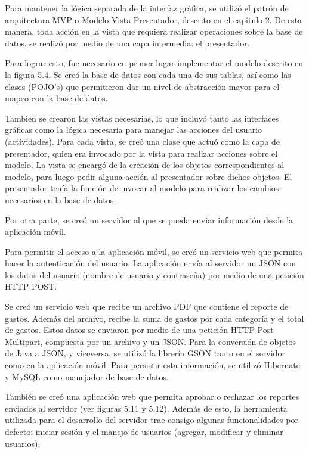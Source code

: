 Para mantener la lógica separada de la interfaz gráfica, se utilizó el patrón de arquitectura MVP o Modelo Vista Presentador, descrito en el capítulo 2. De esta manera, toda acción en la vista que requiera realizar operaciones sobre la base de datos, se realizó por medio de una capa intermedia: el presentador. 

Para lograr esto, fue necesario en primer lugar implementar el modelo descrito en la figura 5.4. Se creó la base de datos con cada una de sus tablas, así como las clases (POJO's) que permitieron dar un nivel de abstracción mayor para el mapeo con la base de datos.

También se crearon las vistas necesarias, lo que incluyó tanto las interfaces gráficas como la lógica necesaria para manejar las acciones del usuario (actividades). Para cada vista, se creó una clase que actuó como la capa de presentador, quien era invocado por la vista para realizar acciones sobre el modelo. La vista se encargó de la creación de los objetos correspondientes al modelo, para luego pedir alguna acción al presentador sobre dichos objetos. El presentador tenía la función de invocar al modelo para realizar los cambios necesarios en la base de datos.

Por otra parte, se creó un servidor al que se pueda enviar información desde la aplicación móvil. 

Para permitir el acceso a la aplicación móvil, se creó un servicio web que permita hacer la autenticación del usuario. La aplicación envía al servidor un JSON con los datos del usuario (nombre de usuario y contraseña) por medio de una petición HTTP POST.

Se creó un servicio web que recibe un archivo PDF que contiene el reporte de gastos. Además del archivo, recibe la suma de gastos por cada categoría y el total de gastos. Estos datos se enviaron por medio de una petición HTTP Post Multipart, compuesta por un archivo y un JSON. Para la conversión de objetos de Java a JSON, y viceversa, se utilizó la librería GSON tanto en el servidor como en la aplicación móvil. Para persistir esta información, se utilizó Hibernate y MySQL como manejador de base de datos.

También se creó una aplicación web que permita aprobar o rechazar los reportes enviados al servidor (ver figuras 5.11 y 5.12). Además de esto, la herramienta utilizada para el desarrollo del servidor trae consigo algunas funcionalidades por defecto: iniciar sesión y el manejo de usuarios (agregar, modificar y eliminar usuarios).

